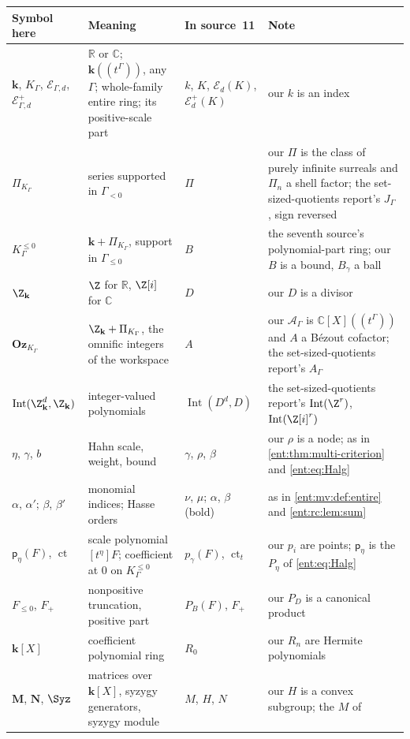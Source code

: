 \documentclass[11pt]{article}
\theoremstyle{plain}
\theoremstyle{plain}
\theoremstyle{plain}
\theoremstyle{definition}
\theoremstyle{definition}
\theoremstyle{definition}
\theoremstyle{definition}
\theoremstyle{remark}
\newcommand{\C}{\mathbb C}\newcommand{\R}{\mathbb R}
\newcommand{\K}{K_\Gamma}\newcommand{\KD}{K_\Delta}
\newcommand{\A}{\mathcal A_\Gamma}\newcommand{\OO}{\mathcal O_\Gamma}
\newcommand{\kk}{\mathbf k}\newcommand{\PP}{\mathbb P}
\newcommand{\Oz}{\mathbf{Oz}}\newcommand{\Ed}{\mathcal E_{\Gamma,d}}
\newcommand{\Kle}{K_\Gamma^{\le0}}\DeclareMathOperator{\Jac}{Jac}
\newcommand{\Zk}{\Z_{\kk}}\newcommand{\OzK}{\Oz_{\K}}
\newcommand{\PiK}{\Pi_{\K}}\newcommand{\pg}{\mathsf p}
\DeclareMathOperator{\Int}{Int}\DeclareMathOperator{\ct}{ct}
\begin{document}
\begin{center}\small
\begin{tabularx}{\textwidth}{@{}P{0.2\textwidth}P{0.3\textwidth}P{0.17\textwidth}Y@{}}
\toprule
Symbol here & Meaning & In source~11 & Note\\\midrule
$\kk$, $\K$, $\Ed$, $\Ed^{+}$ & $\R$ or $\C$; $\kk((t^\Gamma))$, any
$\Gamma$; whole-family entire ring; its positive-scale part & $k$, $K$,
$\mathcal E_d(K)$, $\mathcal E_d^+(K)$ & our $k$ is an index\\[0.3em]
$\PiK$ & series supported in $\Gamma_{<0}$ & $\Pi$ & our $\Pi$ is the class of
purely infinite surreals and $\Pi_n$ a shell factor; the
set-sized-quotients report's $J_\Gamma$, sign reversed\\[0.3em]
$\Kle$ & $\kk+\PiK$, support in $\Gamma_{\le0}$ & $B$ & the seventh source's
polynomial-part ring; our $B$ is a bound, $B_\gamma$ a ball\\[0.3em]
$\Zk$ & $\Z$ for $\R$, $\Z[i]$ for $\C$ & $D$ & our $D$ is a divisor\\[0.3em]
$\OzK$ & $\Zk+\PiK$, the omnific integers of the workspace & $A$ & our $\A$ is
$\C[X]((t^\Gamma))$ and $A$ a B\'ezout cofactor; the set-sized-quotients
report's $A_\Gamma$\\[0.3em]
$\Int(\Zk^d,\Zk)$ & integer-valued polynomials & $\Int(D^d,D)$ & the
set-sized-quotients report's $\Int(\Z^r)$, $\Int(\Z[i]^r)$\\[0.3em]
$\eta$, $\gamma$, $b$ & Hahn scale, weight, bound & $\gamma$, $\rho$, $\beta$ &
our $\rho$ is a node; as in \cref{ent:thm:multi-criterion} and
\eqref{ent:eq:Halg}\\[0.3em]
$\alpha$, $\alpha'$; $\beta$, $\beta'$ & monomial indices; Hasse orders &
$\nu$, $\mu$; $\alpha$, $\beta$ (bold) & as in \cref{ent:mv:def:entire} and
\cref{ent:rc:lem:sum}\\[0.3em]
$\pg_\eta(F)$, $\ct$ & scale polynomial $[t^\eta]F$; coefficient at $0$ on
$\Kle$ & $p_\gamma(F)$, $\operatorname{ct}_t$ & our $p_i$ are points;
$\pg_\eta$ is the $P_\eta$ of \eqref{ent:eq:Halg}\\[0.3em]
$F_{\le0}$, $F_+$ & nonpositive truncation, positive part & $P_B(F)$, $F_+$ &
our $P_D$ is a canonical product\\[0.3em]
$\kk[X]$ & coefficient polynomial ring & $R_0$ & our $R_n$ are Hermite
polynomials\\[0.3em]
$\mathbf M$, $\mathbf N$, $\Syz$ & matrices over $\kk[X]$, syzygy generators,
syzygy module & $M$, $H$, $N$ & our $H$ is a convex subgroup; the $M$ of

\end{tabularx}
\end{center}
\end{document}
